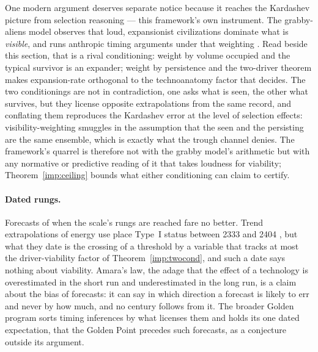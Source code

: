 \begin{remark}
\label{gr:rem:grabby}
One modern argument deserves separate notice because it reaches the
Kardashev picture from selection reasoning --- this framework's own
instrument. The grabby-aliens model observes that loud, expansionist
civilizations dominate what is \emph{visible}, and runs anthropic
timing arguments under that weighting \cite{HMMP21}. Read beside this
section, that is a rival conditioning: weight by volume occupied and
the typical survivor is an expander; weight by persistence and the
two-driver theorem makes expansion-rate orthogonal to the technoanatomy factor
that decides. The two conditionings are not in contradiction, one
asks what is seen, the other what survives, but they license
opposite extrapolations from the same record, and conflating them
reproduces the Kardashev error at the level of selection effects:
visibility-weighting smuggles in the assumption that the seen and the
persisting are the same ensemble, which is exactly what the trough
channel denies. The framework's quarrel is therefore not with the
grabby model's arithmetic but with any normative or predictive reading
of it that takes loudness for viability; Theorem~\ref{imp:ceiling} bounds
what either conditioning can claim to certify.
\end{remark}

\paragraph{Dated rungs.} Forecasts of when the scale's rungs are reached
fare no better. Trend extrapolations of energy use place Type~I status
between 2333 and 2404 \cite{Jiang22}, but what they date is the crossing
of a threshold by a variable that tracks at most the driver-viability
factor of Theorem~\ref{imp:twocond}, and such a date says nothing about
viability. Amara's law, the adage that the effect of a technology is
overestimated in the short run and underestimated in the long run, is a
claim about the bias of forecasts: it can say in which direction a
forecast is likely to err and never by how much, and no century follows
from it. The broader Golden program sorts timing inferences by what
licenses them and holds its one dated expectation, that the Golden Point
precedes such forecasts, as a conjecture outside its argument.

